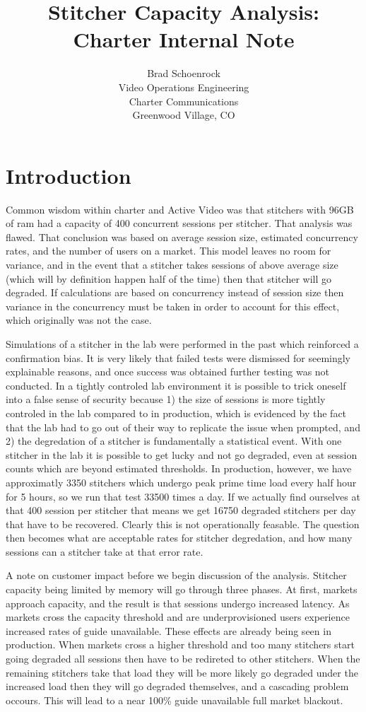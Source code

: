 \documentclass{article}
\author{Brad Schoenrock\\Video Operations Engineering\\Charter Communications\\Greenwood Village, CO}
\title{Stitcher Capacity Analysis: Charter Internal Note}
\date{}
\begin{document}
\maketitle

\section{Introduction}

Common wisdom within charter and Active Video was that stitchers with 96GB of ram had a capacity of 400 concurrent sessions per stitcher. That analysis was flawed. That conclusion was based on average session size, estimated concurrency rates, and the number of users on a market. This model leaves no room for variance, and in the event that a stitcher takes sessions of above average size (which will by definition happen half of the time) then that stitcher will go degraded. If calculations are based on concurrency instead of session size then variance in the concurrency must be taken in order to account for this effect, which originally was not the case. 

Simulations of a stitcher in the lab were performed in the past which reinforced a confirmation bias. It is very likely that failed tests were dismissed for seemingly explainable reasons, and once success was obtained further testing was not conducted. In a tightly controled lab environment it is possible to trick oneself into a false sense of security because 1) the size of sessions is more tightly controled in the lab compared to in production, which is evidenced by the fact that the lab had to go out of their way to replicate the issue when prompted, and 2) the degredation of a stitcher is fundamentally a statistical event. With one stitcher in the lab it is possible to get lucky and not go degraded, even at session counts which are beyond estimated thresholds. In production, however, we have approximatly 3350 stitchers which undergo peak prime time load every half hour for 5 hours, so we run that test 33500 times a day. If we actually find ourselves at that 400 session per stitcher that means we get 16750 degraded stitchers per day that have to be recovered. Clearly this is not operationally feasable. The question then becomes what are acceptable rates for stitcher degredation, and how many sessions can a stitcher take at that error rate. 

A note on customer impact before we begin discussion of the analysis. Stitcher capacity being limited by memory will go through three phases. At first, markets approach capacity, and the result is that sessions undergo increased latency. As markets cross the capacity threshold and are underprovisioned users experience increased rates of guide unavailable. These effects are already being seen in production. When markets cross a higher threshold and too many stitchers start going degraded all sessions then have to be redireted to other stitchers. When the remaining stitchers take that load they will be more likely go degraded under the increased load then they will go degraded themselves, and a cascading problem occours. This will lead to a near 100\% guide unavailable full market blackout. 
\end{document}
